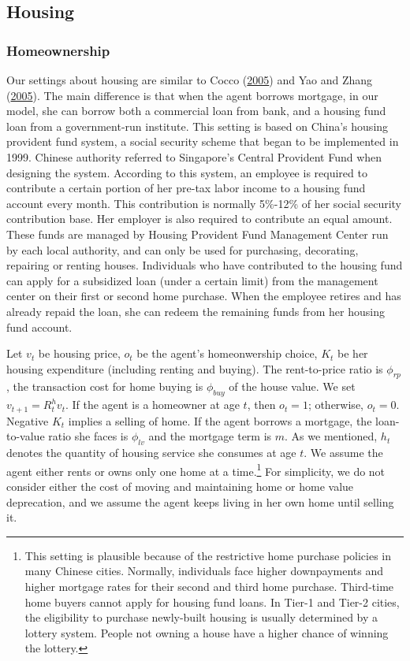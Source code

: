 \documentclass[
  12pt,
]{article}
\begin{document}
\hypertarget{housing}{%
\subsection{Housing}\label{housing}}

\hypertarget{homeownership}{%
\subsubsection{Homeownership}\label{homeownership}}

Our settings about housing are similar to Cocco
(\protect\hyperlink{ref-cocco_portfolio_2005}{2005}) and Yao and Zhang
(\protect\hyperlink{ref-yao_optimal_2005}{2005}). The main difference is
that when the agent borrows mortgage, in our model, she can borrow both
a commercial loan from bank, and a housing fund loan from a
government-run institute. This setting is based on China's housing
provident fund system, a social security scheme that began to be
implemented in 1999. Chinese authority referred to Singapore's Central
Provident Fund when designing the system. According to this system, an
employee is required to contribute a certain portion of her pre-tax
labor income to a housing fund account every month. This contribution is
normally 5\%-12\% of her social security contribution base. Her employer
is also required to contribute an equal amount. These funds are managed
by Housing Provident Fund Management Center run by each local authority,
and can only be used for purchasing, decorating, repairing or renting
houses. Individuals who have contributed to the housing fund can apply
for a subsidized loan (under a certain limit) from the management center
on their first or second home purchase. When the employee retires and
has already repaid the loan, she can redeem the remaining funds from her
housing fund account.

Let \(v_t\) be housing price, \(o_t\) be the agent's homeonwership
choice, \(K_t\) be her housing expenditure (including renting and
buying). The rent-to-price ratio is \(\phi_{rp}\), the transaction cost
for home buying is \(\phi_{buy}\) of the house value. We set
\(v_{t+1}=R^h_tv_t\). If the agent is a homeowner at age \(t\), then
\(o_t = 1\); otherwise, \(o_t = 0\). Negative \(K_t\) implies a selling
of home. If the agent borrows a mortgage, the loan-to-value ratio she
faces is \(\phi_{lv}\) and the mortgage term is \(m\). As we mentioned,
\(h_t\) denotes the quantity of housing service she consumes at age
\(t\). We assume the agent either rents or owns only one home at a
time.\footnote{This setting is plausible because of the restrictive home
  purchase policies in many Chinese cities. Normally, individuals face
  higher downpayments and higher mortgage rates for their second and
  third home purchase. Third-time home buyers cannot apply for housing
  fund loans. In Tier-1 and Tier-2 cities, the eligibility to purchase
  newly-built housing is usually determined by a lottery system. People
  not owning a house have a higher chance of winning the lottery.} For
simplicity, we do not consider either the cost of moving and maintaining
home or home value deprecation, and we assume the agent keeps living in
her own home until selling it.
\end{document}
